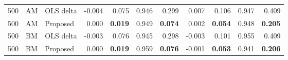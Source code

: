 \begin{table}[t]
\begin{tabular}{rllrrrrrrrr}
\midrule
500 & AM & OLS delta & -0.004 & 0.075 & 0.946 & 0.299 & 0.007 & 0.106 & 0.947 & 0.409 \\
500 & AM & Proposed & 0.000 & \textbf{0.019} & 0.949 & \textbf{0.074} & 0.002 & \textbf{0.054} & 0.948 & \textbf{0.205} \\
\midrule
500 & BM & OLS delta & -0.003 & 0.076 & 0.945 & 0.298 & -0.003 & 0.101 & 0.955 & 0.409 \\
500 & BM & Proposed & 0.000 & \textbf{0.019} & 0.959 & \textbf{0.076} & -0.001 & \textbf{0.053} & 0.941 & \textbf{0.206} \\
\bottomrule
\end{tabular}
\end{table}
